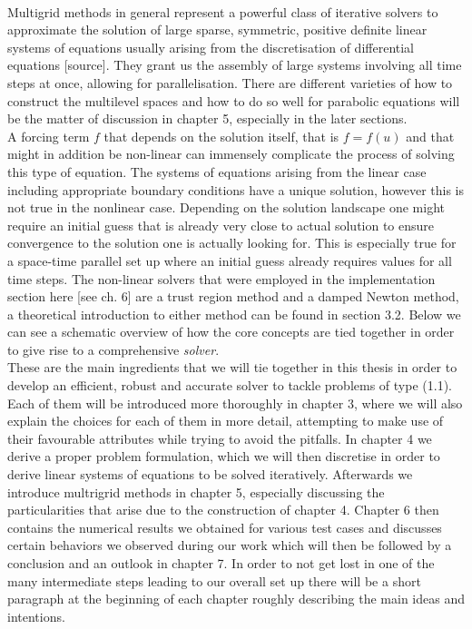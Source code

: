 \documentclass[../draft_1.tex]{subfiles}
\begin{document}
\smallskip
\\
Multigrid methods in general represent a powerful class of iterative solvers to approximate the solution of large sparse, symmetric, positive definite linear systems of equations usually arising from the discretisation of differential equations [source]. 
They grant us the assembly of large systems involving all time steps at once, allowing for parallelisation. There are different varieties of how to construct the multilevel spaces and how to do so well for parabolic equations will be the matter of discussion in chapter 5, especially in the later sections. 
\smallskip
\\
A forcing term $f$ that depends on the solution itself, that is $f = f(u)$ and that might in addition be non-linear can immensely complicate the process of solving this type of equation. The systems of equations arising from the linear case including appropriate boundary conditions have a unique solution, however this is not true in the nonlinear case.  Depending on the solution landscape one might require an initial guess that is already very close to actual solution to ensure convergence  to the solution one is actually looking for. This is especially true for a space-time parallel set up where an initial guess already requires values for all time steps. The non-linear solvers that were employed in the implementation section here [see ch. 6] are a trust region method and a damped Newton method, a theoretical introduction to either method can be found in section 3.2. Below we can see a schematic overview of how the core concepts are tied together in order to give rise to a comprehensive \textit{solver}. 
\smallskip
\\
These are the main ingredients that we will tie together in this thesis in order to develop an efficient, robust and accurate solver to tackle problems of type (1.1). Each of them will be introduced more thoroughly in chapter 3, where we will also explain the choices for each of them in more detail, attempting to make use of their favourable attributes while trying to avoid the pitfalls. In chapter 4 we derive a proper problem formulation, which we will then discretise in order to derive linear systems of equations to be solved iteratively. Afterwards we introduce multrigrid methods in chapter 5, especially discussing the particularities that arise due to the construction of chapter 4. Chapter 6 then contains the numerical results we obtained for various test cases and discusses certain behaviors we observed during our work which will then be followed by a conclusion and an outlook in chapter 7. In order to not get lost in one of the many intermediate steps leading to our overall set up there will be a short paragraph at the beginning of each chapter roughly describing the main ideas and intentions.
\end{document}
